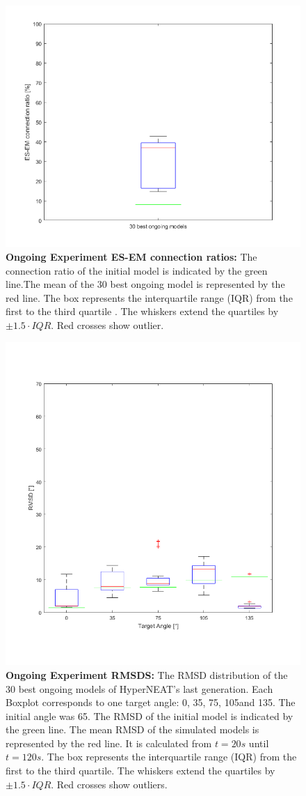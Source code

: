 \begin{figure}[tb]
	\centering
	\includegraphics[width=0.7\linewidth]{figures/OngoingModel/connProbBox}
	\caption[Ongoing Experiment ES-EM connection ratios]{\textbf{Ongoing Experiment ES-EM connection ratios:} The connection ratio of the initial model is indicated by the green line.The mean of the 30 best ongoing model is represented by the red line. The box represents the interquartile range (IQR) from the first to the third quartile . The whiskers extend the quartiles by $\pm1.5\cdot IQR$. Red crosses show outlier.}
	\label{fig:connprobbox}
\end{figure}	

\begin{figure}[tb]
	\centering
	\includegraphics[width=0.7\linewidth]{figures/OngoingModel/ongoingBoxPlot}
	\caption[Ongoing Experiment RMSDS]{\textbf{Ongoing Experiment RMSDS:} The RMSD distribution of the 30 best ongoing models of HyperNEAT's last generation. Each Boxplot corresponds to one target angle: 0\degree, 35\degree, 75\degree, 105\degree and 135\degree. The initial angle was 65\degree. The RMSD of the initial model is indicated by the green line. The mean RMSD of the simulated models is represented by the red line. It is calculated from $t=20s$ until $t=120s$. The box represents the interquartile range (IQR) from the first to the third quartile. The whiskers extend the quartiles by $\pm1.5\cdot IQR$. Red crosses show outliers.}
	\label{fig:ongoingboxplot}
\end{figure}


